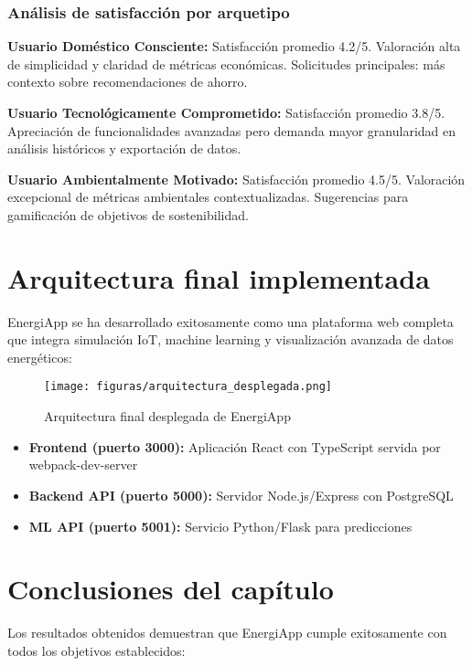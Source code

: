 \subsubsection{Análisis de satisfacción por arquetipo}

\textbf{Usuario Doméstico Consciente:} Satisfacción promedio 4.2/5. Valoración alta de simplicidad y claridad de métricas económicas. Solicitudes principales: más contexto sobre recomendaciones de ahorro.

\textbf{Usuario Tecnológicamente Comprometido:} Satisfacción promedio 3.8/5. Apreciación de funcionalidades avanzadas pero demanda mayor granularidad en análisis históricos y exportación de datos.

\textbf{Usuario Ambientalmente Motivado:} Satisfacción promedio 4.5/5. Valoración excepcional de métricas ambientales contextualizadas. Sugerencias para gamificación de objetivos de sostenibilidad.

\section{Arquitectura final implementada}

EnergiApp se ha desarrollado exitosamente como una plataforma web completa que integra simulación IoT, machine learning y visualización avanzada de datos energéticos:

\begin{figure}[H]
    \centering
    \texttt{[image: figuras/arquitectura\_desplegada.png]}
    \caption{Arquitectura final desplegada de EnergiApp}
    \label{fig:arquitectura_desplegada}
\end{figure}

\begin{itemize}
    \item \textbf{Frontend (puerto 3000):} Aplicación React con TypeScript servida por webpack-dev-server
    \item \textbf{Backend API (puerto 5000):} Servidor Node.js/Express con PostgreSQL
    \item \textbf{ML API (puerto 5001):} Servicio Python/Flask para predicciones
\end{itemize}

\section{Conclusiones del capítulo}

Los resultados obtenidos demuestran que EnergiApp cumple exitosamente con todos los objetivos establecidos:

